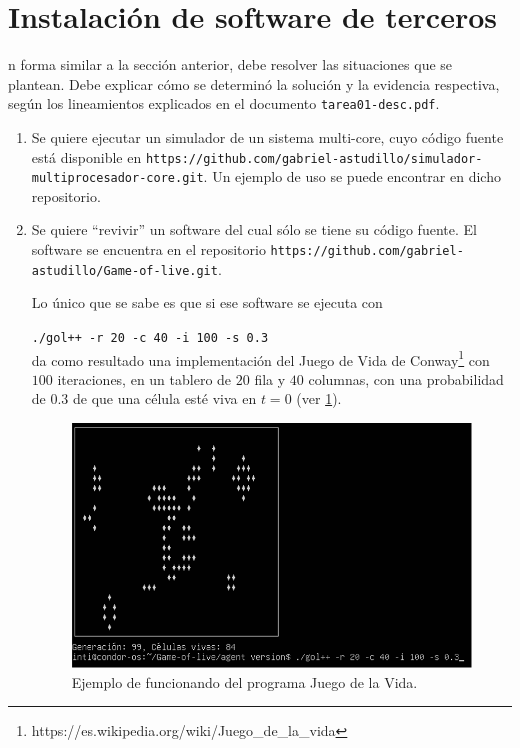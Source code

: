 \documentclass[10pt,letterpaper,twoside,onecolumn]{rho-class/rho}
\begin{document}
\section{Instalación de software de terceros}
    n forma similar a la sección anterior, debe resolver las situaciones que se plantean. Debe explicar cómo se determinó la solución y la evidencia respectiva, según los lineamientos explicados en el documento \texttt{tarea01-desc.pdf}.

    \begin{enumerate}
        \item  Se quiere ejecutar un simulador de un sistema multi-core, cuyo código fuente está disponible en \texttt{https://github.com/gabriel-astudillo/simulador-multiprocesador-core.git}. Un ejemplo de uso se puede encontrar en dicho repositorio.

        \item Se quiere ``revivir'' un software del cual sólo se tiene su código fuente. El software se encuentra en el repositorio \texttt{https://github.com/gabriel-astudillo/Game-of-live.git}.

        \begin{addmargin}[10mm]{0mm}%
            Lo único que se sabe es que si ese software se ejecuta con\newline
            
            \texttt{./gol++ -r 20 -c 40 -i 100 -s 0.3}\\
            
            da como resultado una implementación del Juego de Vida de Conway\footnote{https://es.wikipedia.org/wiki/Juego\_de\_la\_vida}  con $100$ iteraciones, en un tablero de $20$ fila y $40$ columnas, con una probabilidad de $0.3$ de que una célula esté viva en $t=0$ (ver \ref{fig:gol-demo}).

            \begin{figure}[H]
                \centering
                \includegraphics[width=0.40\columnwidth]{figures/gol-demo.png}
                \caption{Ejemplo de funcionando del programa Juego de la Vida.}
                \label{fig:gol-demo}
            \end{figure}
            
        \end{addmargin}
        
    \end{enumerate}
\end{document}
